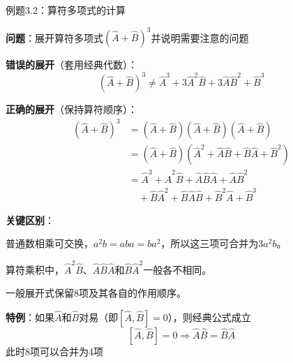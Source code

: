 \begin{frame}{例题3.2：算符多项式的计算}

  \textbf{问题}：展开算符多项式$(\hat{A}+\hat{B})^3$并说明需要注意的问题

  \iqbmicrosep

  \begin{iqbitemize}
    \item \textbf{错误的展开}（套用经典代数）：
    \[
      (\hat{A}+\hat{B})^3 \neq \hat{A}^3 + 3\hat{A}^2\hat{B} + 3\hat{A}\hat{B}^2 + \hat{B}^3
    \]

    \item \textbf{正确的展开}（保持算符顺序）：
    \begin{align*}
      (\hat{A}+\hat{B})^3 &= (\hat{A}+\hat{B})(\hat{A}+\hat{B})(\hat{A}+\hat{B}) \\
      &= (\hat{A}+\hat{B})(\hat{A}^2 + \hat{A}\hat{B} + \hat{B}\hat{A} + \hat{B}^2) \\
      &= \hat{A}^3 + \hat{A}^2\hat{B} + \hat{A}\hat{B}\hat{A} + \hat{A}\hat{B}^2 \\
      &\quad + \hat{B}\hat{A}^2 + \hat{B}\hat{A}\hat{B} + \hat{B}^2\hat{A} + \hat{B}^3
    \end{align*}

    \item \textbf{关键区别}：
    \begin{iqbitemize}
      \item 普通数相乘可交换，$a^2b=aba=ba^2$，所以这三项可合并为$3a^2b$。
      \item 算符乘积中，$\hat{A}^2\hat{B}$、$\hat{A}\hat{B}\hat{A}$和$\hat{B}\hat{A}^2$一般各不相同。
      \item 一般展开式保留8项及其各自的作用顺序。
    \end{iqbitemize}

    \item \textbf{特例}：如果$\hat{A}$和$\hat{B}$对易（即$[\hat{A},\hat{B}]=0$），则经典公式成立
    \[
      [\hat{A},\hat{B}]=0 \Rightarrow \hat{A}\hat{B} = \hat{B}\hat{A}
    \]
    此时8项可以合并为4项
  \end{iqbitemize}

\end{frame}


